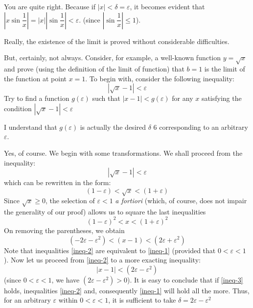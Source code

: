 {\athr You are quite right. Because if  $|x| < \delta = \varepsilon$, it becomes evident that $\left| x \sin \dfrac{1}{x}\right| = |x| \left| \sin \dfrac{1}{x} \right| < \varepsilon$.
(since $\left| \sin \dfrac{1}{x} \right| \leqslant 1$). 

\rdr Really, the existence of the limit is proved
without considerable difficulties. 

\athr But, certainly, not always. Consider, for
example, a well-known function $y = \sqrt{x}$ and prove (using the definition of the limit of function) that $b = 1$ is the limit of the function at point $x = 1$.
To begin with, consider the following inequality:
\begin{equation*}%
\left|\sqrt{x} -1  \right| < \varepsilon
\end{equation*}
Try to find a function $g(\varepsilon)$ such that $\left|x - 1 \right|<g(\varepsilon)$
for any $x$ satisfying the condition  $\left|\sqrt{x} - 1 \right|< \varepsilon$

\rdr I understand that $g(\varepsilon)$ is actually the desired $\delta$ 6 corresponding to an arbitrary $\varepsilon$.

\athr Yes, of course. We begin with some transformations. We shall proceed from the inequality:
\begin{equation}%
\left|\sqrt{x} -1 \right| < \varepsilon
\label{ineq-1}
\end{equation}
which can be rewritten in the form:
\begin{equation*}%
(1 - \varepsilon) < \sqrt{x} < (1+ \varepsilon)
\end{equation*}
Since $\sqrt{x} \geqslant 0$, the selection of $\varepsilon < 1$ \emph{a fortiori} (which, of course, does not impair the generality of our proof) allows us to square the last inequalities
\begin{equation*}%
(1 - \varepsilon)^{2} < x < (1+ \varepsilon)^{2}
\end{equation*}
 On removing the parentheses, we obtain
\begin{equation}%
(-2\varepsilon - \varepsilon^{2}) < (x -1) < (2\varepsilon + \varepsilon^{2})
\label{ineq-2}
\end{equation}
Note that inequalities \eqref{ineq-2} are equivalent to \eqref{ineq-1} (provided that $0< \varepsilon < 1$). Now let us proceed from \eqref{ineq-2} to a more exacting inequality:
\begin{equation}%
|x -1| < (2\varepsilon - \varepsilon^{2})
\label{ineq-3}
\end{equation}
(since $0< \varepsilon < 1$, we have $(2\varepsilon - \varepsilon^{2}) > 0$). It is easy to conclude that if \eqref{ineq-3} holds, inequalities \eqref{ineq-2} and, consequently \eqref{ineq-1} will hold all the more. Thus, for an arbitrary $\varepsilon$ within $0< \varepsilon < 1$, it is sufficient to take $\delta = 2 \varepsilon - \varepsilon^{2}$

}
